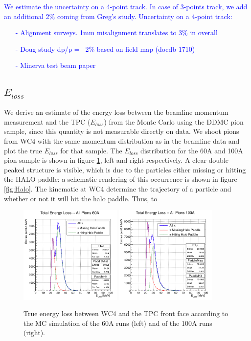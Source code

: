 \textcolor{blue}{  
We estimate the uncertainty on a 4-point track. In case of 3-points track, we add an additional 2\% coming from Greg's study. 
Uncertainty on a 4-point track:
\begin{itemize}
\item[-]  Alignment surveys. 1mm misalignment translates to 3\% in overall
\item[-] Doug study dp/p = ~2\% based on field map (docdb 1710)
\item[-] Minerva test beam paper
\end{itemize}
}

\subsection{$E_{loss}$}
We derive an estimate of the energy loss between the beamline momentum measurement and the TPC ($E_{loss}$) from the Monte Carlo using the DDMC pion sample, since this quantity is not  measurable directly on data. We shoot pions from WC4 with the same momentum distribution as in the beamline data and plot the true $E_{loss}$ for that sample. The $E_{loss}$ distribution for the 60A  and 100A pion sample is shown in figure \ref{fig:ELoss60A}, left and right respectively. A clear double peaked structure is visible, which is due to the particles either missing or hitting the HALO paddle: a schematic rendering of this occurrence is  shown in figure \ref{fig:Halo}. The kinematic at WC4 determine the trajectory of a particle and whether or not it will hit the halo paddle. Thus, to  

\begin{figure}[hbpt]
\centering
\includegraphics[width=0.45\textwidth]{Chapter-9/Images/E_loss60A.png}
\includegraphics[width=0.45\textwidth]{Chapter-9/Images/E_loss100A.png}
\caption{True energy loss between WC4 and the TPC front face according to the MC simulation of the 60A runs (left) and of the 100A runs (right).}
\label{fig:ELoss60A}
\end{figure}

